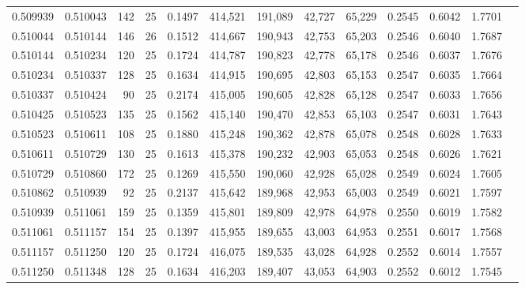 \begin{tabular}{rrrrrrrrrrrrr}
0.509939 & 0.510043 &   142 &  25 &                                     0.1497 & 414,521 & 191,089 &  42,727 &  65,229 & 0.2545 & 0.6042 & 1.7701 \\
0.510044 & 0.510144 &   146 &  26 &                                     0.1512 & 414,667 & 190,943 &  42,753 &  65,203 & 0.2546 & 0.6040 & 1.7687 \\
0.510144 & 0.510234 &   120 &  25 &                                     0.1724 & 414,787 & 190,823 &  42,778 &  65,178 & 0.2546 & 0.6037 & 1.7676 \\
0.510234 & 0.510337 &   128 &  25 &                                     0.1634 & 414,915 & 190,695 &  42,803 &  65,153 & 0.2547 & 0.6035 & 1.7664 \\
0.510337 & 0.510424 &    90 &  25 &                                     0.2174 & 415,005 & 190,605 &  42,828 &  65,128 & 0.2547 & 0.6033 & 1.7656 \\
0.510425 & 0.510523 &   135 &  25 &                                     0.1562 & 415,140 & 190,470 &  42,853 &  65,103 & 0.2547 & 0.6031 & 1.7643 \\
0.510523 & 0.510611 &   108 &  25 &                                     0.1880 & 415,248 & 190,362 &  42,878 &  65,078 & 0.2548 & 0.6028 & 1.7633 \\
0.510611 & 0.510729 &   130 &  25 &                                     0.1613 & 415,378 & 190,232 &  42,903 &  65,053 & 0.2548 & 0.6026 & 1.7621 \\
0.510729 & 0.510860 &   172 &  25 &                                     0.1269 & 415,550 & 190,060 &  42,928 &  65,028 & 0.2549 & 0.6024 & 1.7605 \\
0.510862 & 0.510939 &    92 &  25 &                                     0.2137 & 415,642 & 189,968 &  42,953 &  65,003 & 0.2549 & 0.6021 & 1.7597 \\
0.510939 & 0.511061 &   159 &  25 &                                     0.1359 & 415,801 & 189,809 &  42,978 &  64,978 & 0.2550 & 0.6019 & 1.7582 \\
0.511061 & 0.511157 &   154 &  25 &                                     0.1397 & 415,955 & 189,655 &  43,003 &  64,953 & 0.2551 & 0.6017 & 1.7568 \\
0.511157 & 0.511250 &   120 &  25 &                                     0.1724 & 416,075 & 189,535 &  43,028 &  64,928 & 0.2552 & 0.6014 & 1.7557 \\
0.511250 & 0.511348 &   128 &  25 &                                     0.1634 & 416,203 & 189,407 &  43,053 &  64,903 & 0.2552 & 0.6012 & 1.7545 \\

\end{tabular}
